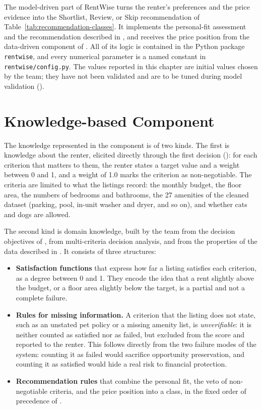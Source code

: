 \documentclass[12pt,a4paper]{report}
\begin{document}
The model-driven part of RentWise turns the renter's preferences and the
price evidence into the Shortlist, Review, or Skip recommendation of
Table~\ref{tab:recommendation-classes}. It implements the personal-fit
assessment and the recommendation described in , and
receives the price position from the data-driven component of
. All of its logic is contained in the Python package
\texttt{rentwise}, and every numerical parameter is a named constant in
\texttt{rentwise/config.py}. The values reported in this chapter are
initial values chosen by the team; they have not been validated and are
to be tuned during model validation ().

\section{Knowledge-based Component}

The knowledge represented in the component is of two kinds. The first is
knowledge about the renter, elicited directly through the first decision
(): for each criterion that matters to them, the renter
states a target value and a weight between 0 and 1, and a weight of 1.0
marks the criterion as non-negotiable. The criteria are limited to what the
listings record: the monthly budget, the floor area, the numbers of
bedrooms and bathrooms, the 27 amenities of the cleaned dataset (parking,
pool, in-unit washer and dryer, and so on), and whether cats and dogs are
allowed.

The second kind is domain knowledge, built by the team from the decision
objectives of , from multi-criteria decision analysis,
and from the properties of the data described in .
It consists of three structures:

\begin{itemize}[leftmargin=*]
  \item \textbf{Satisfaction functions} that express how far a listing
  satisfies each criterion, as a degree between 0 and 1. They encode the
  idea that a rent slightly above the budget, or a floor area slightly
  below the target, is a partial and not a complete failure.
  \item \textbf{Rules for missing information.} A criterion that the
  listing does not state, such as an unstated pet policy or a missing
  amenity list, is \emph{unverifiable}: it is neither counted as satisfied
  nor as failed, but excluded from the score and reported to the renter.
  This follows directly from the two failure modes of the system: counting
  it as failed would sacrifice opportunity preservation, and counting it as
  satisfied would hide a real risk to financial protection.
  \item \textbf{Recommendation rules} that combine the personal fit, the
  veto of non-negotiable criteria, and the price position into a class,
  in the fixed order of precedence of .
\end{itemize}
\end{document}
